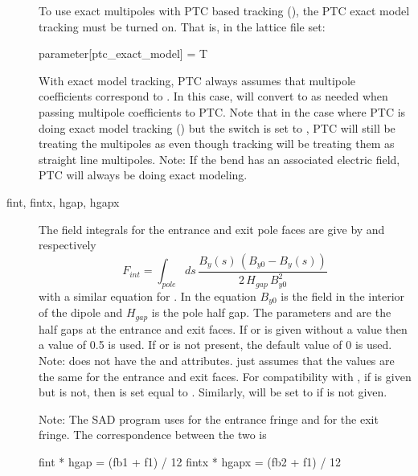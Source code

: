 \begin{description}
To use exact multipoles with PTC based tracking (), the PTC exact model
tracking must be turned on. That is, in the lattice file set:
\begin{example2}
  parameter[ptc_exact_model] = T
\end{example2}
With exact model tracking, PTC always assumes that multipole coefficients correspond to
. In this case, \bmad will convert  to
 as needed when passing multipole coefficients to PTC. Note that in
the case where PTC is doing exact model tracking () but the
 switch is set to , PTC will still be treating the multipoles
as  even though \bmad tracking will be treating them as straight
line multipoles. Note: If the bend has an associated electric field, PTC will always be
doing exact modeling.
  \item[fint, fintx, \Newline hgap, hgapx] \Newline
The field integrals for the entrance and
exit pole faces are give by  and  respectively
\begin{equation}
  F_{int} = \int_{pole} \! \! ds \, \frac{B_y(s) \, (B_{y0} - B_y(s))}
  {2 \, H_{gap} \, B_{y0}^2}
  \label{fsbbb}
\end{equation}
with a similar equation for . In the equation $B_{y0}$ is the field in the
interior of the dipole and $H_{gap}$ is the pole half gap.  The parameters  and
 are the half gaps at the entrance and exit faces. If  or  is
given without a value then a value of 0.5 is used. If  or  is not
present, the default value of 0 is used. Note: \mad does not have the  and
 attributes. \mad just assumes that the values are the same for the entrance and
exit faces. For compatibility with \mad, if  is given but  is not, then
 is set equal to . Similarly,  will be set to  if
 is not given.

Note: The SAD program uses  for the entrance fringe and  for the exit
fringe. The correspondence between the two is
\begin{example2}
  fint  * hgap  = (fb1 + f1) / 12
  fintx * hgapx = (fb2 + f1) / 12
\end{example2}


\end{description}
